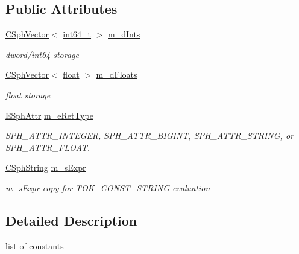 \subsection*{Public Attributes}
\begin{DoxyCompactItemize}
\item 
\hyperlink{classCSphVector}{C\-Sph\-Vector}$<$ \hyperlink{sphinxstd_8h_a996e72f71b11a5bb8b3b7b6936b1516d}{int64\-\_\-t} $>$ \hyperlink{classConstList__c_a607e78bece916b50e58b7a1eb9f6e65a}{m\-\_\-d\-Ints}
\begin{DoxyCompactList}\small\item\em dword/int64 storage \end{DoxyCompactList}\item 
\hyperlink{classCSphVector}{C\-Sph\-Vector}$<$ \hyperlink{sphinxexpr_8cpp_a0e0d0739f7035f18f949c2db2c6759ec}{float} $>$ \hyperlink{classConstList__c_a6e8e9934d2e75fe650aced5c5f33f453}{m\-\_\-d\-Floats}
\begin{DoxyCompactList}\small\item\em float storage \end{DoxyCompactList}\item 
\hyperlink{sphinxexpr_8h_aa883df0db2e4468a107fdd2d2ae625a3}{E\-Sph\-Attr} \hyperlink{classConstList__c_a71168a3a2e84bd34d9f49acf9ad320aa}{m\-\_\-e\-Ret\-Type}
\begin{DoxyCompactList}\small\item\em S\-P\-H\-\_\-\-A\-T\-T\-R\-\_\-\-I\-N\-T\-E\-G\-E\-R, S\-P\-H\-\_\-\-A\-T\-T\-R\-\_\-\-B\-I\-G\-I\-N\-T, S\-P\-H\-\_\-\-A\-T\-T\-R\-\_\-\-S\-T\-R\-I\-N\-G, or S\-P\-H\-\_\-\-A\-T\-T\-R\-\_\-\-F\-L\-O\-A\-T. \end{DoxyCompactList}\item 
\hyperlink{structCSphString}{C\-Sph\-String} \hyperlink{classConstList__c_a44386b345080954be5a2fad2c4d6ba6c}{m\-\_\-s\-Expr}
\begin{DoxyCompactList}\small\item\em m\-\_\-s\-Expr copy for T\-O\-K\-\_\-\-C\-O\-N\-S\-T\-\_\-\-S\-T\-R\-I\-N\-G evaluation \end{DoxyCompactList}\end{DoxyCompactItemize}


\subsection{Detailed Description}
list of constants 

